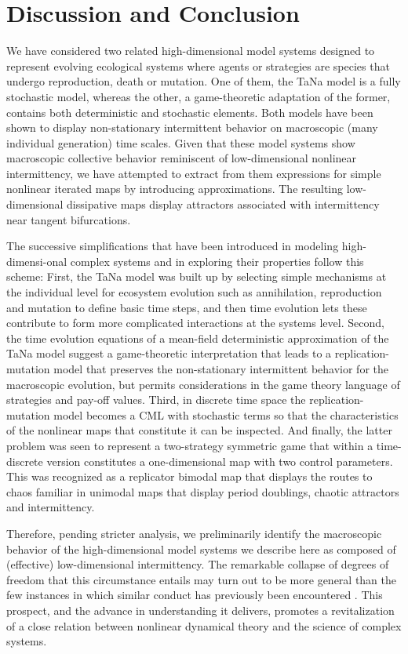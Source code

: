 \documentclass[12pt]{article}
\begin{document}
\section{Discussion and Conclusion}   
 We have considered two related high-dimensional model systems designed to represent evolving ecological systems where agents or strategies are species that undergo reproduction, death or mutation. One of them, the TaNa model is a fully stochastic model, whereas the other, a game-theoretic adaptation of the former, contains both deterministic and stochastic elements. Both models have been shown to display non-stationary intermittent behavior on macroscopic (many individual generation) time scales. Given that these model systems show macroscopic collective behavior reminiscent of low-dimensional nonlinear intermittency, we have attempted to extract from them expressions for simple nonlinear iterated maps by introducing approximations. The resulting low-dimensional dissipative maps display attractors associated with intermittency near tangent bifurcations.

The successive simplifications that have been introduced in modeling high-dimensi-onal complex systems and in exploring their properties follow this scheme: First, the TaNa model was built up by selecting simple mechanisms at the individual level for ecosystem evolution such as annihilation, reproduction and mutation to define basic time steps, and then time evolution lets these contribute to form more complicated interactions at the systems level. Second, the time evolution equations of a mean-field deterministic approximation of the TaNa model suggest a game-theoretic interpretation that leads to a replication-mutation model that preserves the non-stationary intermittent behavior for the macroscopic evolution, but permits considerations in the game theory language of strategies and pay-off values. Third, in discrete time space the replication-mutation model becomes a CML with stochastic terms so that the characteristics of the nonlinear maps that constitute it can be inspected. And finally, the latter problem was seen to represent a two-strategy symmetric game that within a time-discrete version constitutes a one-dimensional map with two control parameters. This was recognized \cite{DV_AR_AS_2011} as a replicator bimodal map that displays the routes to chaos familiar in unimodal maps that display period doublings, chaotic attractors and intermittency.

Therefore, pending stricter analysis, we preliminarily identify the macroscopic behavior of the high-dimensional model systems we describe here as composed of (effective) low-dimensional intermittency. The remarkable collapse of degrees of freedom that this circumstance entails may turn out to be more general than the few instances in which similar conduct has previously been encountered \cite{Chate_Manneville_1992,Ott_Antonsen_2008}. This prospect, and the advance in understanding it delivers, promotes a revitalization of a close relation between nonlinear dynamical theory and the science of complex systems.       
\bigskip
\end{document}
